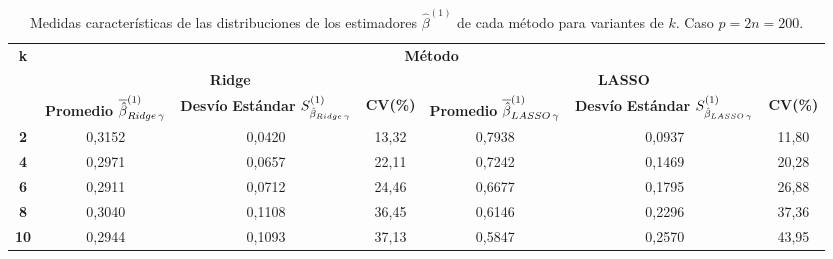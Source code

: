 \documentclass[a4paper,12pt]{report}
\begin{document}
\begin{table}[H]
\centering
\caption{Medidas características de las distribuciones de los estimadores $\hat{\beta}^{(1)}$ de cada método para variantes de $k$. Caso $p=2n=200$.}
\label{tab: sit 2 B 1 med std}
\footnotesize
\begin{tabular}{c|ccc|ccc}
 \multirow{3}{*}[-2em]{\textbf{k}} & \multicolumn{6}{c}{\textbf{Método}} \\[2ex]
 & \multicolumn{3}{c}{\textbf{Ridge}} & \multicolumn{3}{c}{\textbf{LASSO}} \\[2ex]
 & \scriptsize\makecell{\textbf{Promedio} \\ $\overline{\hat{\beta}}_{Ridge \hspace{0.05cm} \gamma}^{(1)}$} & \scriptsize\makecell{\textbf{Desvío} \\ \textbf{Estándar} \\ $S_{\hat{\beta}_{Ridge \hspace{0.05cm} \gamma}}^{(1)}$} & \scriptsize\textbf{CV(\%)} & \scriptsize\makecell{\textbf{Promedio} \\ $\overline{\hat{\beta}}_{LASSO \hspace{0.05cm} \gamma}^{(1)}$} & \scriptsize\makecell{\textbf{Desvío} \\ \textbf{Estándar} \\ $S_{\hat{\beta}_{LASSO \hspace{0.05cm} \gamma}}^{(1)}$} & \scriptsize\textbf{CV(\%)} \\ \hline
\textbf{2}   & 0,3152 & 0,0420 & \hspace{0.05cm} 13,32  & 0,7938 & 0,0937 & \hspace{0.05cm} 11,80  \\
\textbf{4}   & 0,2971 & 0,0657 & \hspace{0.05cm} 22,11  & 0,7242 & 0,1469 & \hspace{0.05cm} 20,28  \\
\textbf{6}   & 0,2911 & 0,0712 & \hspace{0.05cm} 24,46  & 0,6677 & 0,1795 & \hspace{0.05cm} 26,88  \\
\textbf{8}   & 0,3040 & 0,1108 & \hspace{0.05cm} 36,45  & 0,6146 & 0,2296 & \hspace{0.05cm} 37,36  \\
\textbf{10}  & 0,2944 & 0,1093 & \hspace{0.05cm} 37,13  & 0,5847 & 0,2570 & \hspace{0.05cm} 43,95  \\

\end{tabular}
\end{table}
\end{document}
